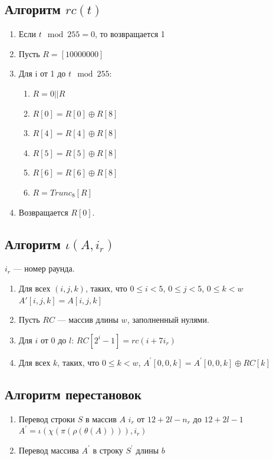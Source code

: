 \documentclass{book}
\begin{document}
\subsection*{Алгоритм $rc(t)$}
\begin{enumerate}
    \item Если $t{\mod 2}55=0$, то возвращается 1
    \item Пусть $R=[10000000]$
    \item Для i от 1 до $t \mod 255$:
    \begin{enumerate}
        \item $R = 0 || R$
        \item $R[0]=R[0]\oplus R[8]$
        \item $R[4]=R[4]\oplus R[8]$
        \item $R[5]=R[5]\oplus R[8]$
        \item $R[6]=R[6]\oplus R[8]$
        \item $R=Trunc_{8}[R]$
    \end{enumerate}
    \item Возвращается $R[0]$.
\end{enumerate}
\subsection*{Алгоритм $\iota (A,i_{r})$}
$i_{r}$ — номер раунда.
\begin{enumerate}
    \item Для всех $(i,j,k)$, таких, что $0\leqslant i<5$, $0\leqslant j<5$, $0\leqslant k<w$ $A'[i,j,k]=A[i,j,k]$
    \item Пусть $RC$ — массив длины $w$, заполненный нулями.
    \item Для $i$ от 0 до $l$: $RC[2^{i}-1]=rc(i+7i_{r})$
    \item Для всех $k$, таких, что $ 0\leqslant k<w$, $A^{'}[0,0,k]=A^{'}[0,0,k]\oplus RC[k]$
\end{enumerate}
\subsection*{Алгоритм перестановок}
\begin{enumerate}
    \item Перевод строки $S$ в массив $A$
     $i_{r}$ от $12+2l-n_{r}$ до $12+2l-1$ $A^{'}=\iota (\chi (\pi (\rho (\theta (A)))),i_{r})$
    \item  Перевод массива $A^{'}$ в строку $S^{'}$ длины $b$
\end{enumerate}
\end{document}
